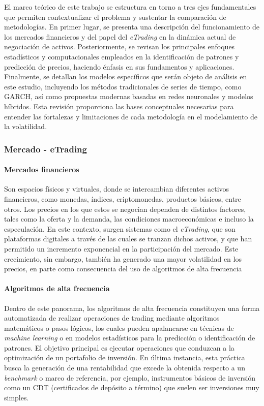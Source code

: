 \documentclass[12pt]{paper}
\begin{document}
El marco teórico de este trabajo se estructura en torno a tres ejes fundamentales que permiten contextualizar el problema y sustentar la comparación de metodologías. En primer lugar, se presenta una descripción del funcionamiento de los mercados financieros y del papel del \textit{eTrading} en la dinámica actual de negociación de activos. Posteriormente, se revisan los principales enfoques estadísticos y computacionales empleados en la identificación de patrones y predicción de precios, haciendo énfasis en sus fundamentos y aplicaciones. Finalmente, se detallan los modelos específicos que serán objeto de análisis en este estudio, incluyendo los métodos tradicionales de series de tiempo, como GARCH, así como propuestas modernas basadas en redes neuronales y modelos híbridos. Esta revisión proporciona las bases conceptuales necesarias para entender las fortalezas y limitaciones de cada metodología en el modelamiento de la volatilidad.

\subsubsection[Mercado - eTrading]{Mercado - eTrading}

\paragraph{Mercados financieros}
Son espacios físicos y virtuales, donde se intercambian diferentes activos financieros, como monedas, índices, criptomonedas, productos básicos, entre otros. Los precios en los que estos se negocian dependen de distintos factores, tales como la oferta y la demanda, las condiciones macroeconómicas e incluso la especulación. En este contexto, surgen sistemas como el \textit{eTrading}, que son plataformas digitales a través de las cuales se tranzan dichos activos, y que han permitido un incremento exponencial en la participación del mercado. Este crecimiento, sin embargo, también ha generado una mayor volatilidad en los precios, en parte como consecuencia del uso de algoritmos de alta frecuencia \cite{jansen2020machine}

\paragraph{Algoritmos de alta frecuencia}
Dentro de este panorama, los algoritmos de alta frecuencia constituyen una forma automatizada de realizar operaciones de trading mediante algoritmos matemáticos o pasos lógicos, los cuales pueden apalancarse en técnicas de \textit{machine learning} o en modelos estadísticos para la predicción o identificación de patrones. El objetivo principal es ejecutar operaciones que conduzcan a la optimización de un portafolio de inversión. En última instancia, esta práctica busca la generación de una rentabilidad que excede la obtenida respecto a un \textit{benchmark} \cite{jansen2020machine} o marco de referencia, por ejemplo, instrumentos básicos de inversión como un CDT (certificados de depósito a término) que suelen ser inversiones muy simples.
\end{document}
